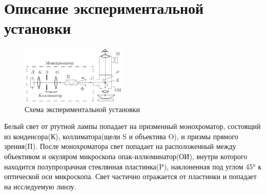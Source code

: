 \section*{Описание экспериментальной установки}

\begin{figure}[H]
	\centering
	\includegraphics[width=0.45\textwidth]{../Изображения/Установка.png}
	\caption{Схема экспериментальной установки}
\end{figure}

Белый свет от ртутной лампы попадает на призменный монохроматор, состоящий из конденсора(К), коллиматора(щели S и объектива O), и призмы прямого зрения(П). После монохроматора свет попадает на расположенный между объективом и окуляром микроскопа опак-иллюминатор(ОИ), внутри которого находится полупрозрачная стеклянная пластинка(P), наклоненная под углом 45° к оптической оси микроскопа. Свет частично отражается от пластинки и попадает на исследуемую линзу. 